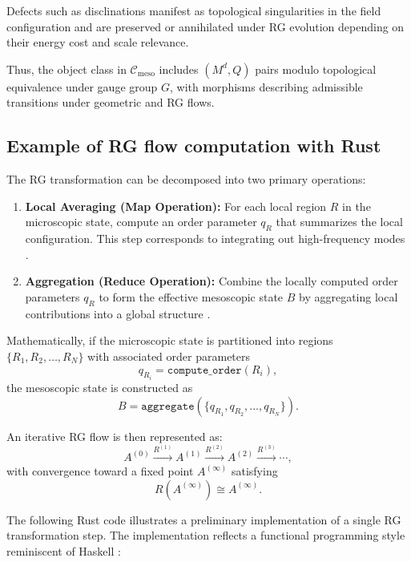 	Defects such as disclinations manifest as topological singularities in the field configuration and are preserved or annihilated under RG evolution depending on their energy cost and scale relevance.

	Thus, the object class in \(\mathcal{C}_{\text{meso}}\) includes \( (M^d, Q) \) pairs modulo topological equivalence under gauge group \(G\), with morphisms describing admissible transitions under geometric and RG flows.

	\subsection{Example of RG flow computation with Rust}
	
	The RG transformation can be decomposed into two primary operations:
	\begin{enumerate}[label=(\arabic*)]
		\item \textbf{Local Averaging (Map Operation):} For each local region \(R\) in the microscopic state, compute an order parameter \(q_R\) that summarizes the local configuration. This step corresponds to integrating out high-frequency modes \cite{degennes1993physics}.
		\item \textbf{Aggregation (Reduce Operation):} Combine the locally computed order parameters \(q_R\) to form the effective mesoscopic state \(B\) by aggregating local contributions into a global structure \cite{hudak1989conception}.
	\end{enumerate}
	
	Mathematically, if the microscopic state is partitioned into regions \( \{ R_1, R_2, \dots, R_N \} \) with associated order parameters
	\[
	q_{R_i} = \texttt{compute\_order}(R_i),
	\]
	the mesoscopic state is constructed as
	\[
	B = \texttt{aggregate}(\{q_{R_1}, q_{R_2}, \dots, q_{R_N}\}).
	\]
	
	An iterative RG flow is then represented as:
	\[
	A^{(0)} \xrightarrow{R^{(1)}} A^{(1)} \xrightarrow{R^{(2)}} A^{(2)} \xrightarrow{R^{(3)}} \cdots,
	\]
	with convergence toward a fixed point \(A^{(\infty)}\) satisfying
	\[
	R(A^{(\infty)}) \cong A^{(\infty)}.
	\]
	
	The following Rust code illustrates a preliminary implementation of a single RG transformation step. The implementation reflects a functional programming style reminiscent of Haskell \cite{hudak1989conception}:
	
